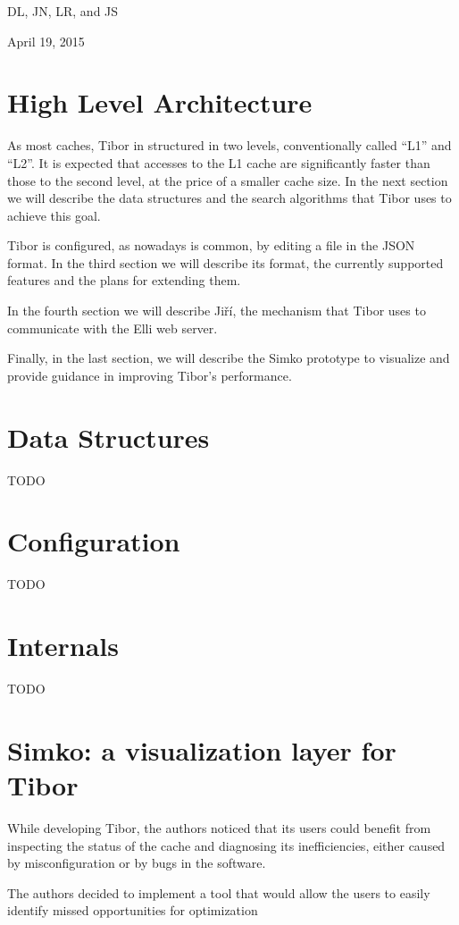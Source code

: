 \documentclass[conference,compsoc]{IEEEtran}
\begin{document}
\hfill DL, JN, LR, and JS
 
\hfill April 19, 2015

\section{High Level Architecture}
As most caches, Tibor in structured in two levels, conventionally called ``L1''
and ``L2''. It is expected that accesses to the L1 cache are significantly
faster than those to the second level, at the price of a smaller cache size.
In the next section we will describe the data structures and the search
algorithms that Tibor uses to achieve this goal.

Tibor is configured, as nowadays is common, by editing a file in the JSON
format. In the third section we will describe its format, the currently
supported features and the plans for extending them.

In the fourth section we will describe Jiří, the mechanism that Tibor uses to
communicate with the Elli web server.

Finally, in the last section, we will describe the Simko prototype to visualize
and provide guidance in improving Tibor's performance.

\section{Data Structures}
TODO

\section{Configuration}
TODO

\section{Internals}
TODO

\section{Simko: a visualization layer for Tibor}
While developing Tibor, the authors noticed that its users could benefit from
inspecting the status of the cache and diagnosing its inefficiencies, either
caused by misconfiguration or by bugs in the software.

The authors decided to implement a tool that would allow the users to easily identify
missed opportunities for optimization
\end{document}
